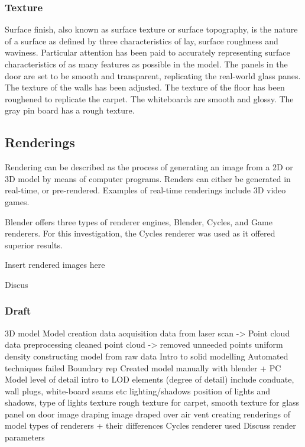 \documentclass[11pt,a4paper]{report}
\begin{document}
				\subsubsection{Texture}
					Surface finish, also known as surface texture or surface topography, is the nature of a surface as defined by three characteristics of lay, surface roughness and waviness.
					\cite{e._paul_degarmo_materials_2003}
					Particular attention has been paid to accurately representing surface characteristics of as many features as possible in the model.
					The panels in the door are set to be smooth and transparent, replicating the real-world glass panes. 
					The texture of the walls has been adjusted.
					The texture of the floor has been roughened to replicate the carpet.
					The whiteboards are smooth and glossy.
					The gray pin board has a rough texture.
			
			\subsection{Renderings}
				Rendering can be described as the process of generating an image from a 2D or 3D model by means of computer programs. Renders can either be generated in real-time, or pre-rendered. Examples of real-time renderings include 3D video games.
				
				Blender offers three types of renderer engines, Blender, Cycles, and Game renderers. For this investigation, the Cycles renderer was used as it offered superior results.
				
				{{Insert rendered images here}} 
				
				Discus 
			
			\subsubsection{Draft}
				3D model
					Model creation
						data acquisition
							data from laser scan -> Point cloud
						data preprocessing
							cleaned point cloud -> removed unneeded points
							uniform density
						constructing model from raw data
							Intro to solid modelling
							Automated techniques failed
							Boundary rep
							Created model manually with blender + PC
					Model level of detail
						intro to LOD
						elements (degree of detail)
							include conduate, wall plugs, white-board seams etc
						lighting/shadows
							position of lights and shadows, type of lights
						texture
							rough texture for carpet, smooth texture for glass panel on door
						image draping
							image draped over air vent
					creating renderings of model
						types of renderers + their differences
						Cycles renderer used
						Discuss render parameters
			
\end{document}
